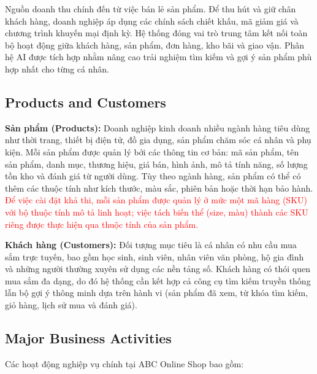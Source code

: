 \documentclass[12pt,a4paper,oneside]{report}
\newif\ifmark \marktrue
\newcommand{\chg}[1]{\ifmark\textcolor{red}{#1}\else #1\fi}
\begin{document}
Nguồn doanh thu chính đến từ việc bán lẻ sản phẩm. Để thu hút và giữ chân khách hàng, doanh nghiệp áp dụng các chính sách chiết khấu, mã giảm giá và chương trình khuyến mại định kỳ. Hệ thống đóng vai trò trung tâm kết nối toàn bộ hoạt động giữa khách hàng, sản phẩm, đơn hàng, kho bãi và giao vận. Phân hệ AI được tích hợp nhằm nâng cao trải nghiệm tìm kiếm và gợi ý sản phẩm phù hợp nhất cho từng cá nhân.

\subsection{Products and Customers}

\textbf{Sản phẩm (Products):} Doanh nghiệp kinh doanh nhiều ngành hàng tiêu dùng như thời trang, thiết bị điện tử, đồ gia dụng, sản phẩm chăm sóc cá nhân và phụ kiện. Mỗi sản phẩm được quản lý bởi các thông tin cơ bản: mã sản phẩm, tên sản phẩm, danh mục, thương hiệu, giá bán, hình ảnh, mô tả tính năng, số lượng tồn kho và đánh giá từ người dùng. Tùy theo ngành hàng, sản phẩm có thể có thêm các thuộc tính như kích thước, màu sắc, phiên bản hoặc thời hạn bảo hành. \chg{Để việc cài đặt khả thi, mỗi sản phẩm được quản lý ở mức một mã hàng (SKU) với bộ thuộc tính mô tả linh hoạt; việc tách biến thể (size, màu) thành các SKU riêng được thực hiện qua thuộc tính của sản phẩm.}

\textbf{Khách hàng (Customers):} Đối tượng mục tiêu là cá nhân có nhu cầu mua sắm trực tuyến, bao gồm học sinh, sinh viên, nhân viên văn phòng, hộ gia đình và những người thường xuyên sử dụng các nền tảng số. Khách hàng có thói quen mua sắm đa dạng, do đó hệ thống cần kết hợp cả công cụ tìm kiếm truyền thống lẫn bộ gợi ý thông minh dựa trên hành vi (sản phẩm đã xem, từ khóa tìm kiếm, giỏ hàng, lịch sử mua và đánh giá).

\subsection{Major Business Activities}

Các hoạt động nghiệp vụ chính tại ABC Online Shop bao gồm:
\end{document}
